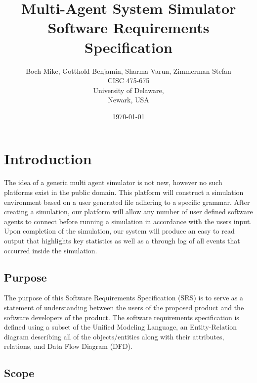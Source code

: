 \documentclass{article}
\begin{document}
\newcommand {\GTK}{\textbf{GTK}}
\newcommand {\nItem}[1]{\item{ \(\underline{#1}\)}}

\newpage
\title{Multi-Agent System Simulator\\Software Requirements Specification }
\author{Boch Mike, Gotthold Benjamin, Sharma Varun, Zimmerman Stefan\\
         CISC 475-675 \\
         University of Delaware,\\
         Newark, USA\\}
\date{\today}
\maketitle

\newpage
\tableofcontents

\newpage
\section{Introduction}

The idea of a generic multi agent simulator is not new, however no such platforms exist in the public domain. This platform will construct a simulation environment based on a user generated file adhering to a specific grammar. After creating a simulation, our platform will allow any number of user defined software agents to connect before running a simulation in accordance with the users input. Upon completion of the simulation, our system will produce an easy to read output that highlights key statistics as well as a through log of all events that occurred inside the simulation.

\subsection{Purpose}

The purpose of this Software Requirements Specification (SRS) is to serve as a statement of understanding between the users of the proposed product and the software developers of the product. The software requirements specification is defined using a subset of the Unified Modeling Language, an Entity-Relation diagram describing all of the objects/entities along with their attributes, relations, and Data Flow Diagram (DFD).

\subsection{Scope}
\end{document}
